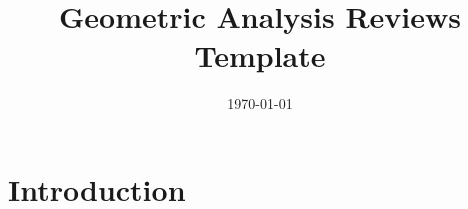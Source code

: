 \documentclass{amsart}
\title[GA Rev Template]
 {Geometric Analysis Reviews Template}
\date{\today}
\begin{document}
\maketitle

\section{Introduction}
\label{sec:intro}
\end{document}
